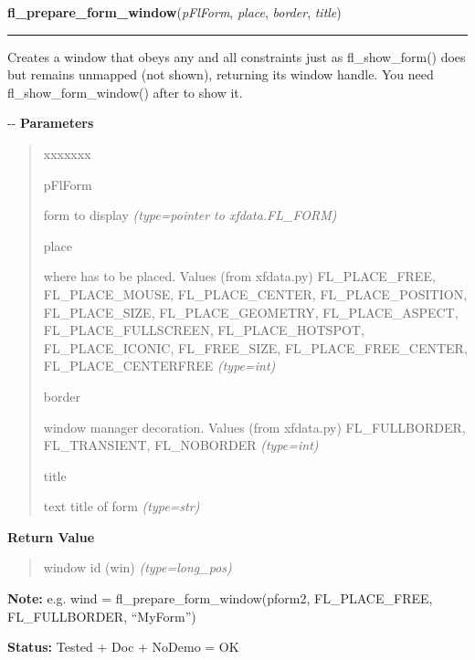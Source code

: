 \hspace{.8\funcindent}\begin{boxedminipage}{\funcwidth}

    \raggedright \textbf{fl\_prepare\_form\_window}(\textit{pFlForm}, \textit{place}, \textit{border}, \textit{title})

    \vspace{-1.5ex}

    \rule{\textwidth}{0.5\fboxrule}
\setlength{\parskip}{2ex}

Creates a window that obeys any and all constraints just as
fl\_show\_form() does but remains unmapped (not shown), returning its
window handle. You need fl\_show\_form\_window() after to show it.

-{}-
\setlength{\parskip}{1ex}
      \textbf{Parameters}
      \vspace{-1ex}

      \begin{quote}
        \begin{Ventry}{xxxxxxx}

          \item[pFlForm]


form to display
            {\it (type=pointer to xfdata.FL\_FORM)}

          \item[place]


where has to be placed. Values (from xfdata.py) FL\_PLACE\_FREE,
FL\_PLACE\_MOUSE, FL\_PLACE\_CENTER, FL\_PLACE\_POSITION, FL\_PLACE\_SIZE,
FL\_PLACE\_GEOMETRY, FL\_PLACE\_ASPECT, FL\_PLACE\_FULLSCREEN,
FL\_PLACE\_HOTSPOT, FL\_PLACE\_ICONIC, FL\_FREE\_SIZE, FL\_PLACE\_FREE\_CENTER,
FL\_PLACE\_CENTERFREE
            {\it (type=int)}

          \item[border]


window manager decoration. Values (from xfdata.py) FL\_FULLBORDER,
FL\_TRANSIENT, FL\_NOBORDER
            {\it (type=int)}

          \item[title]


text title of form
            {\it (type=str)}

        \end{Ventry}

      \end{quote}

      \textbf{Return Value}
    \vspace{-1ex}

      \begin{quote}

window id (win)
      {\it (type=long\_pos)}

      \end{quote}

\textbf{Note:} 
e.g. wind = fl\_prepare\_form\_window(pform2, FL\_PLACE\_FREE,
FL\_FULLBORDER, ``MyForm'')


\textbf{Status:} 
Tested + Doc + NoDemo = OK


    \end{boxedminipage}

